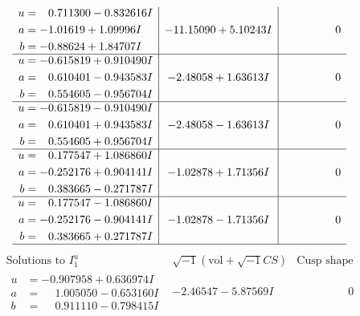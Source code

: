 \documentclass[1p]{elsarticle_modified}
\theoremstyle{definition}
\newcommand{\I}{\sqrt{-1}}
\begin{document}
$$\begin{array}{c|c|c}
\begin{aligned}
u &= \phantom{-}0.711300 - 0.832616 I \\
a &= -1.01619 + 1.09996 I \\
b &= -0.88624 + 1.84707 I\end{aligned}
 & -11.15090 + 5.10243 I & \phantom{-0.000000 } 0 \\ \hline\begin{aligned}
u &= -0.615819 + 0.910490 I \\
a &= \phantom{-}0.610401 - 0.943583 I \\
b &= \phantom{-}0.554605 - 0.956704 I\end{aligned}
 & -2.48058 + 1.63613 I & \phantom{-0.000000 } 0 \\ \hline\begin{aligned}
u &= -0.615819 - 0.910490 I \\
a &= \phantom{-}0.610401 + 0.943583 I \\
b &= \phantom{-}0.554605 + 0.956704 I\end{aligned}
 & -2.48058 - 1.63613 I & \phantom{-0.000000 } 0 \\ \hline\begin{aligned}
u &= \phantom{-}0.177547 + 1.086860 I \\
a &= -0.252176 + 0.904141 I \\
b &= \phantom{-}0.383665 - 0.271787 I\end{aligned}
 & -1.02878 + 1.71356 I & \phantom{-0.000000 } 0 \\ \hline\begin{aligned}
u &= \phantom{-}0.177547 - 1.086860 I \\
a &= -0.252176 - 0.904141 I \\
b &= \phantom{-}0.383665 + 0.271787 I\end{aligned}
 & -1.02878 - 1.71356 I & \phantom{-0.000000 } 0\\
 \hline 
 \end{array}$$\newpage$$\begin{array}{c|c|c}  
\text{Solutions to }I^u_{1}& \I (\text{vol} + \sqrt{-1}CS) & \text{Cusp shape}\\
 \hline 
\begin{aligned}
u &= -0.907958 + 0.636974 I \\
a &= \phantom{-}1.005050 - 0.653160 I \\
b &= \phantom{-}0.911110 - 0.798415 I\end{aligned}
 & -2.46547 - 5.87569 I & \phantom{-0.000000 } 0 \\ \hline\begin{aligned}

\end{aligned}
\end{array}$$
\end{document}
